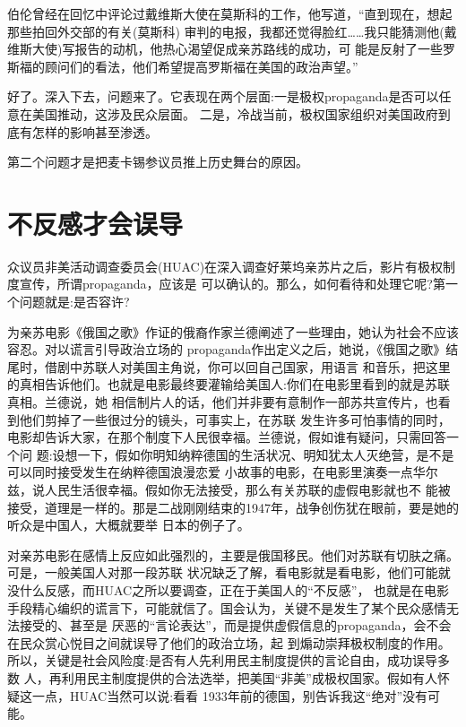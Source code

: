 \documentclass[10pt]{article}
\begin{document}
{伯伦曾经在回忆中评论过戴维斯大使在莫斯科的工作，他写道，``直到现在，想起那些拍回外交部的有关(莫斯科)
审判的电报，我都还觉得脸红……我只能猜测他(戴维斯大使)写报告的动机，他热心渴望促成亲苏路线的成功，可
能是反射了一些罗斯福的顾问们的看法，他们希望提高罗斯福在美国的政治声望。''

好了。深入下去，问题来了。它表现在两个层面:一是极权propaganda是否可以任意在美国推动，这涉及民众层面。
二是，冷战当前，极权国家组织对美国政府到底有怎样的影响甚至渗透。

第二个问题才是把麦卡锡参议员推上历史舞台的原因。

\pagebreak
\section{不反感才会误导}

众议员非美活动调查委员会(HUAC)在深入调查好莱坞亲苏片之后，影片有极权制度宣传，所谓propaganda，应该是
可以确认的。那么，如何看待和处理它呢?第一个问题就是:是否容许?

为亲苏电影《俄国之歌》作证的俄裔作家兰德阐述了一些理由，她认为社会不应该容忍。对以谎言引导政治立场的
propaganda作出定义之后，她说，《俄国之歌》结尾时，借剧中苏联人对美国主角说，你可以回自己国家，用语言
和音乐，把这里的真相告诉他们。也就是电影最终要灌输给美国人:你们在电影里看到的就是苏联真相。兰德说，她
相信制片人的话，他们并非要有意制作一部苏共宣传片，也看到他们剪掉了一些很过分的镜头，可事实上，在苏联
发生许多可怕事情的同时，电影却告诉大家，在那个制度下人民很幸福。兰德说，假如谁有疑问，只需回答一个问
题:设想一下，假如你明知纳粹德国的生活状况、明知犹太人灭绝营，是不是可以同时接受发生在纳粹德国浪漫恋爱
小故事的电影，在电影里演奏一点华尔兹，说人民生活很幸福。假如你无法接受，那么有关苏联的虚假电影就也不
能被接受，道理是一样的。那是二战刚刚结束的1947年，战争创伤犹在眼前，要是她的听众是中国人，大概就要举
日本的例子了。

对亲苏电影在感情上反应如此强烈的，主要是俄国移民。他们对苏联有切肤之痛。可是，一般美国人对那一段苏联
状况缺乏了解，看电影就是看电影，他们可能就没什么反感，而HUAC之所以要调查，正在于美国人的``不反感''，
也就是在电影手段精心编织的谎言下，可能就信了。国会认为，关键不是发生了某个民众感情无法接受的、甚至是
厌恶的``言论表达''，而是提供虚假信息的propaganda，会不会在民众赏心悦目之间就误导了他们的政治立场，起
到煽动崇拜极权制度的作用。所以，关键是社会风险度:是否有人先利用民主制度提供的言论自由，成功误导多数
人，再利用民主制度提供的合法选举，把美国``非美''成极权国家。假如有人怀疑这一点，HUAC当然可以说:看看
1933年前的德国，别告诉我这``绝对''没有可能。

}
\end{document}
